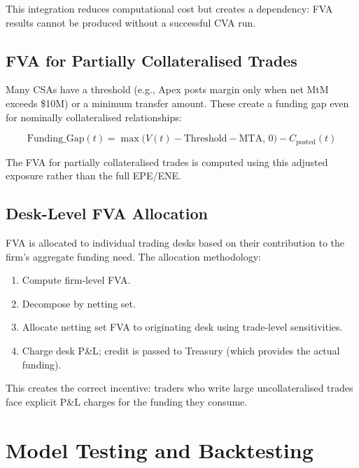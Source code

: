 \documentclass[11pt,a4paper]{article}
\begin{document}
This integration reduces computational cost but creates a dependency: FVA results cannot be
produced without a successful CVA run.

\subsection{FVA for Partially Collateralised Trades}

Many CSAs have a threshold (e.g., Apex posts margin only when net MtM exceeds \$10M) or a
minimum transfer amount. These create a funding gap even for nominally collateralised
relationships:

\begin{equation}
\mathrm{Funding\_Gap}(t) = \max\!\bigl(V(t) - \mathrm{Threshold} - \mathrm{MTA},\,0\bigr) - C_{\mathrm{posted}}(t)
\tag{5}
\end{equation}

The FVA for partially collateralised trades is computed using this adjusted exposure rather
than the full EPE/ENE.

\subsection{Desk-Level FVA Allocation}

FVA is allocated to individual trading desks based on their contribution to the firm's aggregate
funding need. The allocation methodology:
\begin{enumerate}[leftmargin=*]
  \item Compute firm-level FVA.
  \item Decompose by netting set.
  \item Allocate netting set FVA to originating desk using trade-level sensitivities.
  \item Charge desk P\&L; credit is passed to Treasury (which provides the actual funding).
\end{enumerate}

This creates the correct incentive: traders who write large uncollateralised trades face
explicit P\&L charges for the funding they consume.

\section{Model Testing and Backtesting}
\end{document}

